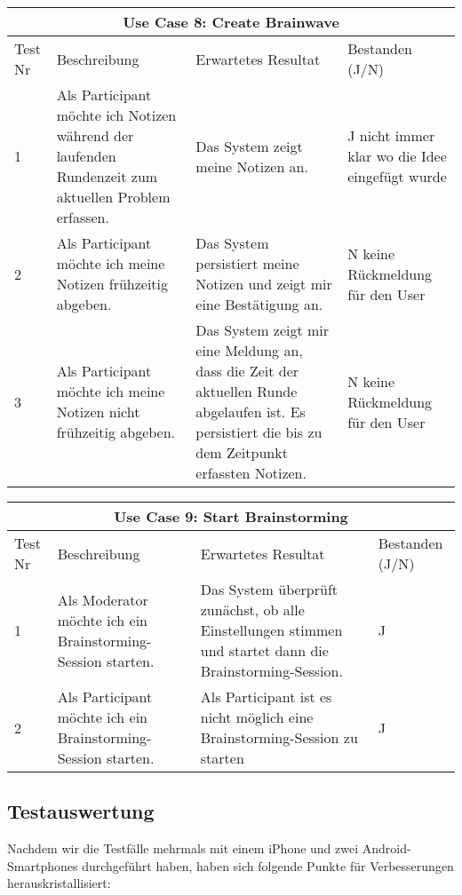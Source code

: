 \renewcommand{\arraystretch}{1.35}
\begin{center}
	\begin{longtable}{| p{1cm} | p{5cm} | p{5cm} | p{2cm} |}
		\hline
		\multicolumn{4}{|c|}{\textbf{Use Case 8: Create Brainwave}}\\
		\hline\hline
		Test Nr & Beschreibung & Erwartetes Resultat & Bestanden (J/N) \\
		\hline
		1 & Als Participant möchte ich Notizen während der laufenden Rundenzeit zum aktuellen Problem erfassen. & Das System zeigt meine Notizen an. & J nicht immer klar wo die Idee eingefügt wurde \\
		\hline
		2 & Als Participant möchte ich meine Notizen frühzeitig abgeben. & Das System persistiert meine Notizen und zeigt mir eine Bestätigung an. & N keine Rückmel\-dung für den User\\
		\hline
		3 & Als Participant möchte ich meine Notizen nicht frühzeitig abgeben. & Das System zeigt mir eine Meldung an, dass die Zeit der aktuellen Runde abgelaufen ist. Es persistiert die bis zu dem Zeitpunkt erfassten Notizen. & N keine Rückmel\-dung für den User \\
		\hline
	\end{longtable}
\end{center}

\renewcommand{\arraystretch}{1.35}
\begin{center}
	\begin{longtable}{| p{1cm} | p{5cm} | p{5cm} | p{2cm} |}
		\hline
		\multicolumn{4}{|c|}{\textbf{Use Case 9: Start Brainstorming}}\\
		\hline\hline
		Test Nr & Beschreibung & Erwartetes Resultat & Bestanden (J/N) \\
		\hline
		1 & Als Moderator möchte ich ein Brainstorming-Session starten. & Das System überprüft zunächst, ob alle Einstellungen stimmen und startet dann die Brainstorming-Session. & J \\
		\hline
		2 & Als Participant möchte ich ein Brainstorming-Session starten. & Als Participant ist es nicht möglich eine Brainstorming-Session zu starten & J\\
		\hline
	\end{longtable}
\end{center}

\subsection{Testauswertung}
Nachdem wir die Testfälle mehrmals mit einem iPhone und zwei Android-Smartphones durchgeführt haben, haben sich folgende Punkte für Verbesserungen herauskristallisiert:

